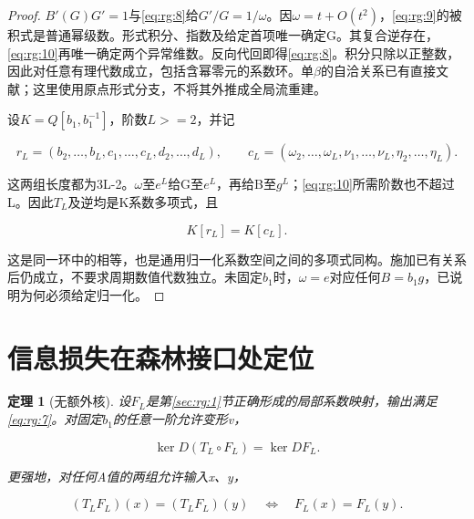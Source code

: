 \documentclass[11pt,a4paper,oneside]{ctexrep}
\theoremstyle{cnplain}
\newtheorem{theorem}{定理}[chapter]
\theoremstyle{definition}
\theoremstyle{remark}
\begin{document}
\begin{proof}

\(B'(G)G'=1\)与\eqref{eq:rg:8}给\(G'/G=1/\omega\)。因\(\omega =t+O(t^{2})\)，\eqref{eq:rg:9}的被积式是普通幂级数。形式积分、指数及给定首项唯一确定G。其复合逆存在，\eqref{eq:rg:10}再唯一确定两个异常维数。反向代回即得\eqref{eq:rg:8}。积分只除以正整数，因此对任意有理代数成立，包括含幂零元的系数环。单\(\beta\)的自洽关系已有直接文献\cite[eq.(3)]{antipin}；这里使用原点形式分支，不将其外推成全局流重建。

设\(K=Q[b_1,b_1^{-1}]\)，阶数\(L>=2\)，并记

\begin{equation}
r_L=(b_2,\ldots,b_L,c_1,\ldots,c_L,d_2,\ldots,d_L),\qquad
 c_L=(\omega_2,\ldots,\omega_L,\nu_1,\ldots,\nu_L,
                    \eta_2,\ldots,\eta_L).
\end{equation}

这两组长度都为3L-2。\(\omega\)至\(e^L\)给G至\(e^L\)，再给B至\(g^L\)；\eqref{eq:rg:10}所需阶数也不超过L。因此\(T_L\)及逆均是K系数多项式，且

\begin{equation}
K[r_L]=K[c_L].                                    \label{eq:rg:11}
\end{equation}

这是同一环中的相等，也是通用归一化系数空间之间的多项式同构。施加已有关系后仍成立，不要求周期数值代数独立。未固定\(b_1\)时，\(\omega =e\)对应任何\(B=b_1g\)，已说明为何必须给定归一化。

\end{proof}

\section{信息损失在森林接口处定位}\label{sec:rg:5}

\begin{theorem}[无额外核]

\label{thm:rg:5.1} 设\(F_L\)是第\ref{sec:rg:1}节正确形成的局部系数映射，输出满足\eqref{eq:rg:7}。对固定\(b_1\)的任意一阶允许变形v，

\begin{equation}
\ker D(T_L\circ F_L)=\ker DF_L.                   \label{eq:rg:12}
\end{equation}

更强地，对任何A值的两组允许输入x、y，

\begin{equation}
(T_LF_L)(x)=(T_LF_L)(y)
       \quad\Longleftrightarrow\quad F_L(x)=F_L(y). \label{eq:rg:13}
\end{equation}

\end{theorem}
\end{document}
